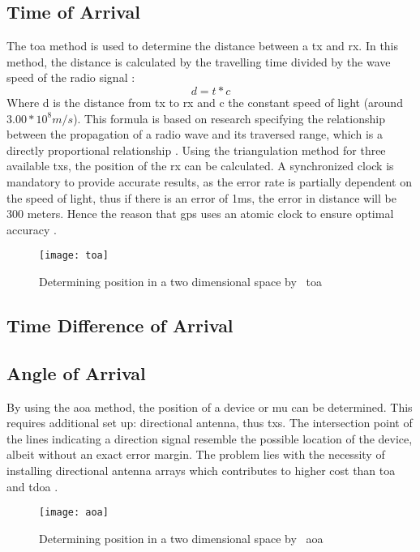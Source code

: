 \subsection{Time of Arrival}
The \acrfull{toa} method is used to determine the distance between a \acrfull{tx} and \acrfull{rx}. In this method, the distance is calculated by the travelling time divided by the wave speed of the radio signal \cite{Loy2018}:
\begin{equation}
d = t * c
\end{equation}
Where d is the distance from \acrshort{tx} to \acrshort{rx} and c the constant speed of light (around $3.00 * 10^8 m/s$). This formula is based on research specifying the relationship between the propagation of a radio wave and its traversed range, which is a directly proportional relationship \cite{S2016}. Using the triangulation method for three available \acrlong{tx}s, the position of the \acrlong{rx} can be calculated. A synchronized clock is mandatory to provide accurate results, as the error rate is partially dependent on the speed of light, thus if there is an error of 1ms, the error in distance will be 300 meters. Hence the reason that \acrfull{gps} uses an atomic clock to ensure optimal accuracy \cite{Jindal}.
\begin{figure}[h!]
\centering
\texttt{[image: toa]}
\caption{Determining position in a two dimensional space by ~\acrlong{toa}~\cite{Jindal}}
\label{fig:toa}
\end{figure}
\subsection{Time Difference of Arrival}
\subsection{Angle of Arrival}
By using the \acrfull{aoa} method, the position of a device or \acrlong{mu} can be determined. This requires additional set up: directional antenna, thus \acrlong{tx}s. The intersection point of the lines indicating a direction signal resemble the possible location of the device, albeit without an exact error margin. The problem lies with the necessity of installing directional antenna arrays which contributes to higher cost than \acrlong{toa} and \acrlong{tdoa} \cite{Jindal}.
\begin{figure}[h!]
\centering
\texttt{[image: aoa]}
\caption{Determining position in a two dimensional space by ~\acrlong{aoa}~\cite{Jindal}}
\label{fig:aoa}
\end{figure}
